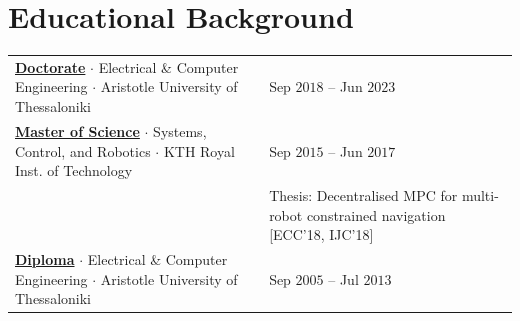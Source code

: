 \documentclass[a4paper,10pt,twoside]{article}
\begin{document}
\section{\textbf{Educational Background}}%
\vspace{-1em}
\begin{center}
\begin{tabular}{ll}
  \href{https://www.didaktorika.gr/eadd/handle/10442/56399?locale=en}{\textbf{Doctorate}} $\cdot$ Electrical \& Computer Engineering $\cdot$ Aristotle University of Thessaloniki & {\small \textcolor{agray}{Sep $2018$ -- Jun $2023$}} \\
  \href{http://kth.diva-portal.org/smash/record.jsf?pid=diva2\%3A1102597\&dswid=2875}{\textbf{Master of Science}} $\cdot$ Systems, Control, and Robotics $\cdot$ KTH Royal Inst. of Technology & {\small \textcolor{agray}{Sep $2015$ -- Jun $2017$}} \\
  & \hspace{-30.3em} Thesis: Decentralised MPC for multi-robot constrained navigation [ECC'18, IJC'18] \\
  \href{https://ikee.lib.auth.gr/record/291560}{\textbf{Diploma}} $\cdot$ Electrical \& Computer Engineering $\cdot$ Aristotle University of Thessaloniki & {\small \textcolor{agray}{Sep $2005$ -- Jul $2013$}}
\end{tabular}
\end{center}
\end{document}
